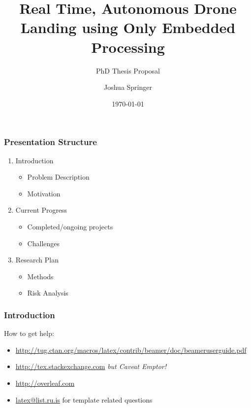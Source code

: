 \documentclass[aspectratio=169]{rubeamer}
\title[RU Presentation]{Real Time, Autonomous Drone Landing using Only Embedded Processing}
\subtitle[demo]{PhD Thesis Proposal}
\author[Springer]{Joshua Springer}
\institute[RU]{Reykjavík University}
\date[2022]{\monthyeardate\today}%
\begin{document}
\begin{frame}[plain]%
  \titlepage

\end{frame}

\begin{frame}
  \frametitle{Presentation Structure}
  \begin{enumerate}
    \item Introduction
      \begin{itemize}
        \item Problem Description
        \item Motivation
      \end{itemize}
    \item Current Progress
      \begin{itemize}
        \item Completed/ongoing projects
        \item Challenges
      \end{itemize}
    \item Research Plan
      \begin{itemize}
        \item Methods
        \item Risk Analysis
      \end{itemize}
  \end{enumerate}
\end{frame}

\begin{frame}
  \frametitle{Introduction}
  How to get help:
  \begin{itemize}
  \item \url{http://tug.ctan.org/macros/latex/contrib/beamer/doc/beameruserguide.pdf}
  \item \url{http://tex.stackexchange.com}  {\it but Caveat Emptor!}\/
  \item \url{http://overleaf.com}
  \item \url{latex@list.ru.is} for template related questions
  \end{itemize}
\end{frame}
\end{document}
